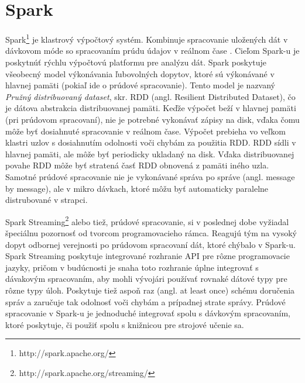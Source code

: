 \section{Spark}
Spark\footnote{http://spark.apache.org/} je klastrový výpočtový systém. Kombinuje spracovanie uložených dát v dávkovom móde so spracovaním prúdu údajov v reálnom čase \citep{cimerman2015prudy}. Cieľom Spark-u je poskytnúť rýchlu výpočtovú platformu pre analýzu dát. Spark poskytuje všeobecný model výkonávania ľubovolných dopytov, ktoré sú výkonávané v hlavnej pamäti (pokiaľ ide o prúdové spracovanie). Tento model je nazvaný \textit{Pružný distribuovaný dataset}, skr. RDD (angl. Resilient Distributed Dataset), čo je dátova abstrakcia distribuovanej pamäti. Keďže výpočet beží v hlavnej pamäti (pri prúdovom spracovaní), nie je potrebné vykonávať zápisy na disk, vďaka čomu môže byť dosiahnuté spracovanie v reálnom čase. Výpočet prebieha vo veľkom klastri uzlov s dosiahnutím odolnosti voči chybám za použitia RDD. RDD  sídli v hlavnej pamäti, ale môže byť periodicky ukladaný na disk. Vďaka distribuovanej povahe RDD môže byť stratená časť RDD obnovená z pamäti iného uzla. Samotné prúdové spracovanie nie je vykonávané správa po správe (angl. message by message), ale v mikro dávkach, ktoré môžu byť automaticky paralelne distrubované v strapci.
\par
Spark Streaming\footnote{http://spark.apache.org/streaming/} alebo tiež, prúdové spracovanie, si v poslednej dobe vyžiadal špeciálnu pozornosť od tvorcom programovacieho rámca. Reagujú tým na vysoký dopyt odbornej verejnosti po prúdovom spracovaní dát, ktoré chýbalo v Spark-u. Spark Streaming poskytuje integrované rozhranie API pre rôzne programovacie jazyky, pričom v budúcnosti je snaha toto rozhranie úplne integrovať s dávakovým spracovaním, aby mohli vývojári používať rovnaké dátové typy pre rôzne typy úloh. Poskytuje tiež aspoň raz (angl. at least once) schému doručenia správ a zaručuje tak odolnosť voči chybám a prípadnej strate správy. Prúdové spracovanie v Spark-u je jednoduché integrovať spolu s dávkovým spracovaním, ktoré poskytuje, či použiť spolu s knižnicou pre strojové učenie sa. 

